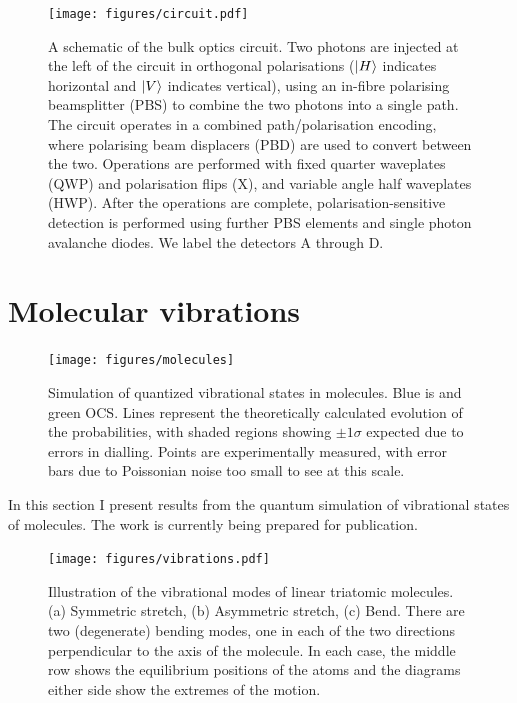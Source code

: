 \begin{figure}[t]
  \centering
  \texttt{[image: figures/circuit.pdf]}
  \caption[A schematic of the bulk optics circuit used for simulations.]
  {A schematic of the bulk optics circuit. Two photons are injected at
  the left of the circuit in orthogonal polarisations (\(\left|H\right\rangle\) indicates
  horizontal and \(\left|V\right\rangle\) indicates vertical), using an in-fibre polarising
  beamsplitter (PBS) to combine the two photons into a single path. The circuit
  operates in a combined path/polarisation encoding, where polarising beam
  displacers (PBD) are used to convert between the two. Operations are performed
  with fixed quarter waveplates (QWP) and polarisation flips (X), and variable
  angle half waveplates (HWP). After the operations are complete,
  polarisation-sensitive detection is performed using further PBS elements and
  single photon avalanche diodes. We label the detectors A through D.}
  \label{fig:circuit}
\end{figure}

\section{Molecular vibrations}
\label{sec:Molecules}
\begin{figure}
  \centering
  \texttt{[image: figures/molecules]}
  \caption[Simulation of quantized vibrational states in molecules]
  {Simulation of quantized vibrational states in molecules. Blue is \co{} and
  green OCS. Lines represent the theoretically calculated evolution of the
  probabilities, with shaded regions showing \(\pm 1 \sigma\) expected due to
  errors in dialling. Points are experimentally measured, with error bars due to
  Poissonian noise too small to see at this scale.}
  \label{fig:molecules}
\end{figure}
In this section I present results from the quantum simulation of vibrational
states of molecules. The work is currently being prepared for publication. 
\begin{figure}[h]
  \centering
  \texttt{[image: figures/vibrations.pdf]}
  \caption[Vibrational modes of linear triatomic molecules]
  {Illustration of the vibrational modes of linear triatomic molecules. (a)
  Symmetric stretch, (b) Asymmetric stretch, (c) Bend. There are two
  (degenerate) bending modes, one in each of the two directions perpendicular to
  the axis of the molecule. In each case, the middle row shows the equilibrium
  positions of the atoms and the diagrams either side show the extremes of the
  motion.}
  \label{fig:vibrations}
\end{figure}

